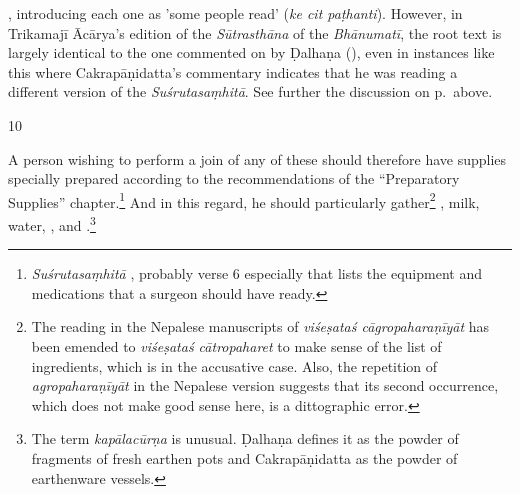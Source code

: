 \begin{translation}
{            \citep[128–129]{acar-1939}, introducing each one as 'some people read' (\emph{ke
            cit paṭhanti}). However,  in Trikamajī Ācārya's edition of the \emph{Sūtrasthāna}
            of the \emph{Bhānumatī}, the root text is largely identical to the one commented
            on by Ḍalhaṇa (\cite{vulgate}), even in instances like this where Cakrapāṇidatta's
            commentary indicates that he was reading a different version of the
            \emph{Suśrutasaṃhitā}. See further the discussion on p.\,\pageref{skinflap}
            above.} 
            \item[10]
    
A person wishing to perform a join of any of these should therefore have supplies
specially prepared according to the recommendations of the “Preparatory Supplies”
chapter.\footnote{\emph{Suśrutasaṃhitā} , probably verse 6
    especially that lists the equipment and medications that a surgeon should have
    ready.}  And in this regard, he should particularly gather\footnote{The reading in
        the Nepalese manuscripts of \emph{viśeṣataś cāgropaharaṇīyāt} has been emended to
        \emph{viśeṣataś cātropaharet} to make sense of the list of ingredients, which is
        in the accusative case. Also, the repetition of \emph{agropaharaṇīyāt} in the
        Nepalese version suggests that its second occurrence, which does not make good
        sense here, is a dittographic error.} , milk,
        water, , and .\footnote{The term \emph{kapālacūrṇa} is unusual. Ḍalhaṇa
            \citep[79]{vulgate} defines it as the powder of fragments of fresh earthen pots
            and Cakrapāṇidatta \citep[129]{acar-1939} as the powder of earthenware vessels.}
    

\end{translation}
